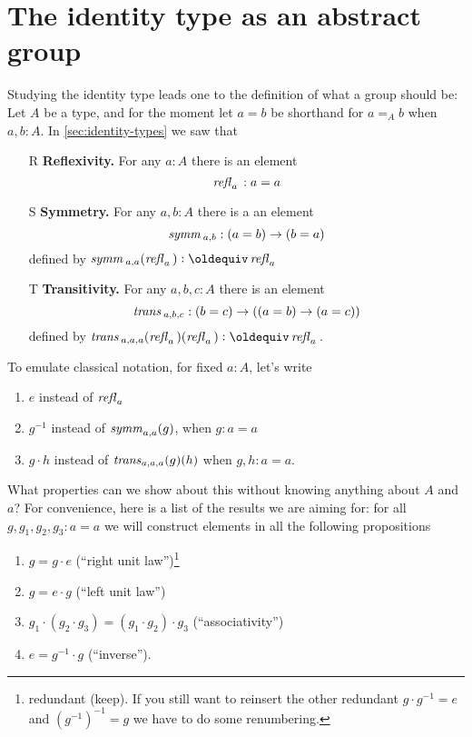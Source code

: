 \section{The identity type as an abstract group }
\label{sec:identity-type-as-abstract}

Studying the identity type leads one to the definition of what a group should be:
Let $A$ be a type, and for the moment let $a=b$ be shorthand for $a=_Ab$ when $a,b:A$.  In \cref{sec:identity-types} we saw that
\begin{enumerate}
\item[R] {\bf Reflexivity.} For any $a:A$ there is an element
$$\mathop{{\it refl}_{a}}{}:a=a$$ 
\item[S] {\bf Symmetry.} For any $a,b:A$ there is a an element $$\mathop{\mathit{symm}}{}_{a,b}:(a=b)\to (b=a)$$ defined by $\symm{}_{a,a}(\refl a{})\defequi\refl a{}$
\item[T] {\bf Transitivity.} For any $a,b,c:A$ there is an element $$\mathop{\mathit{trans}}{}_{a,b,c}:(b=c)\to((a=b)\to(a=c))$$ defined by $\trans{}_{a,a,a}(\refl a{})(\refl a{})\defequi \refl a{}$.
\end{enumerate}

 To emulate classical notation, for fixed $a:A$,  %
let's write
 \begin{enumerate}
 \item $e$ instead of $\mathop{{\it refl}_{a}}{}$
 \item $g^{-1}$ instead of $\mathop{\mathit{symm}}_{a,a}(g)$, when $g:a=a$
 \item $g\cdot h$ instead of $\mathop{\mathit{trans}}_{a,a,a}(g)(h)$ when $g,h:a=a$.
 \end{enumerate}
 What properties can we show about this without knowing anything about $A$ and $a$? For convenience, here is a list of the results we are aiming for: for all $g,g_1,g_2,g_3:a=a$ we will construct elements in all the following propositions
 \begin{enumerate}
 \item $g=g\cdot e$  \qquad(``right unit law'')\footnote{redundant (keep).  If you still want to reinsert the other redundant $g\cdot g^{-1}=e$ and $(g^{-1})^{-1}=g$ we have to do some renumbering.  
}
 \item $g=e\cdot g$ \qquad(``left unit law'')
 \item $g_1\cdot(g_2\cdot g_3)=(g_1\cdot g_2)\cdot g_3$ \qquad(``associativity'')
 \item $e=g^{-1}\cdot g$ \qquad(``inverse'').
 \end{enumerate}
 

